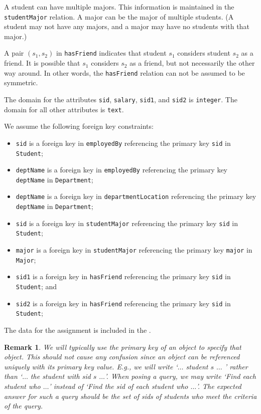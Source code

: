 \documentclass{article}
\newcommand{\blue}[1]{{\color{blue}#1}}
\newtheorem{remark}{Remark}
\begin{document}
A student can have multiple majors. This information is maintained in the {\tt studentMajor} relation.  A major can be
the major of multiple students.  (A student may not have any majors, and a major may
have no students with that major.)

A pair $(s_1,s_2)$ in {\tt hasFriend} indicates that student $s_1$ considers student $s_2$ as a friend.
It is possible that $s_1$ considers $s_2$ as a friend, but not necessarily the other way around.
In other words, the {\tt hasFriend} relation can not be assumed to be symmetric.

The domain for the attributes {\tt sid}, {\tt salary}, {\tt sid1}, and {\tt sid2} is {\tt integer}.   The domain for all other attributes is {\tt text}.

\medskip
We assume the following foreign key constraints:
\begin{itemize}
\item {\tt sid} is a foreign key in {\tt employedBy} referencing the primary key {\tt sid} in {\tt Student};
\item {\tt deptName} is a foreign key in {\tt employedBy} referencing the primary key {\tt deptName} in {\tt Department};
\item {\tt deptName} is a foreign key in {\tt departmentLocation} referencing the primary key {\tt deptName} in {\tt Department};
\item {\tt sid} is a foreign key in {\tt studentMajor} referencing the primary key {\tt sid} in {\tt Student};
\item {\tt major} is a foreign key in {\tt studentMajor} referencing the primary key {\tt major} in {\tt Major};
\item {\tt sid1} is a foreign key in {\tt hasFriend} referencing the primary key {\tt sid} in {\tt Student}; and
\item {\tt sid2} is a foreign key in {\tt hasFriend} referencing the primary key {\tt sid} in {\tt Student};

\end{itemize}


The data for the assignment is included in the \blue{{\tt schema.sql}}.

\begin{remark}
We will typically use the primary key of an object to specify that object.
This should not cause any confusion since an object can be referenced uniquely with its primary key value.
E.g., we will write `\emph{$\ldots$ student $s$ $\ldots$ }' rather than `\emph{$\ldots$ the student with sid $s$ $\ldots$}'.   When posing a query, we may write `\emph{Find each student who $\ldots$}' instead of 
`\emph{Find the sid of each student who $\ldots$}'.   The expected answer for such a query should be the set of sids of students who meet the criteria of the query. 
\end{remark}
\end{document}
